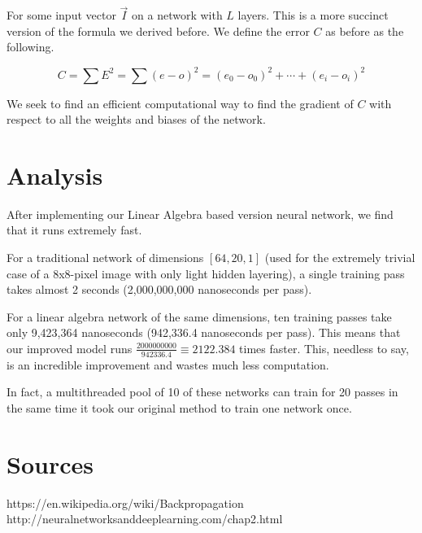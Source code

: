 \documentclass[8pt]{amsart}
\begin{document}
For some input vector $\vec{I}$ on a network with $L$ layers. This is a more
succinct version of the formula we derived before. We define the error $C$ as
before as the following.

\[
    C = \sum E^2 = \sum (e - o)^2 = (e_0 - o_0)^2 + \cdots + (e_i - o_i)^2
\]

We seek to find an efficient computational way to find the gradient of $C$ with
respect to all the weights and biases of the network.

\section{Analysis}

After implementing our Linear Algebra based version neural network, we find that
it runs extremely fast.

For a traditional network of dimensions $[64, 20, 1]$ (used for the extremely
trivial case of a 8x8-pixel image with only light hidden layering), a single training
pass takes almost 2 seconds (2,000,000,000 nanoseconds per pass).

For a linear algebra network of the same dimensions, ten training passes take only
9,423,364 nanoseconds (942,336.4 nanoseconds per pass). This means that our improved
model runs $\frac{2000000000}{942336.4} \equiv 2122.384$ times faster. This, needless
to say, is an incredible improvement and wastes much less computation.

In fact, a multithreaded pool of 10 of these networks can train for 20 passes in the
same time it took our original method to train one network once.

\section{Sources}

https://en.wikipedia.org/wiki/Backpropagation \\
http://neuralnetworksanddeeplearning.com/chap2.html
\end{document}
